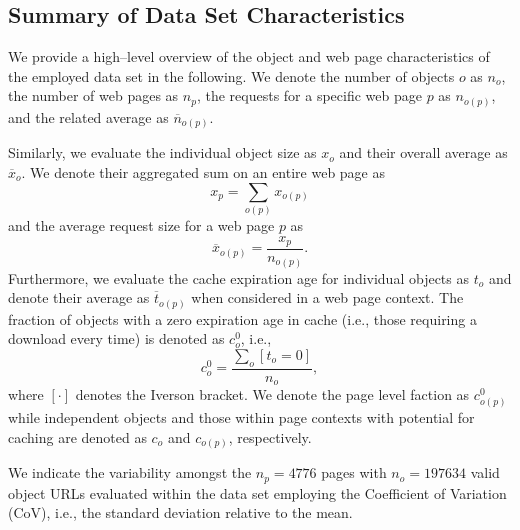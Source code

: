 \subsection*{Summary of Data Set Characteristics}
We provide a high--level overview of the object and web page characteristics of the employed data set in the following.
We denote the number of objects $o$ as $n_o$, the number of web pages as $n_p$, the requests for a specific web page $p$ as $n_{o(p)}$, and the related average as $\overline{n}_{o(p)}$. 

Similarly, we evaluate the individual object size as $x_o$ and their overall average as $\overline{x}_o$.
We denote their aggregated sum on an entire web page as 
\begin{equation}
x_{p}=\sum_{o(p)} x_{o(p)}
\end{equation}
and the average request size for a web page $p$ as  
\begin{equation}
\overline{x}_{o(p)}=\frac{x_{p}}{n_{o(p)}}.
\end{equation}
Furthermore, we evaluate the cache expiration age for individual objects as $t_o$ and denote their average as $\overline{t}_{o(p)}$ when considered in a web page context. 
The fraction of objects with a zero expiration age in cache (i.e., those requiring a download every time) is denoted as $c^0_o$, i.e., 
\begin{equation}
c^0_o=\frac{\sum_o [t_o = 0]}{n_o},
\end{equation}
where $[\cdot]$ denotes the Iverson bracket.
We denote the page level faction as $c^0_{o(p)}$ while independent objects and those within page contexts with potential for caching are denoted as $c_o$ and $c_{o(p)}$, respectively.

We indicate the variability amongst the $n_p=4776$ pages with $n_{o}=197634$ valid object URLs evaluated within the data set employing the Coefficient of Variation (CoV), i.e., the standard deviation relative to the mean. 

